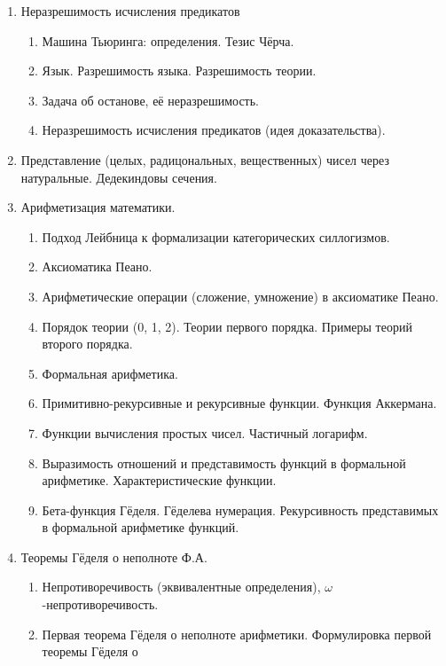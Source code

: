 \documentclass[11pt,a4paper,oneside]{scrartcl}
\begin{document}
\begin{enumerate}
\begin{enumerate}
\item Теорема Гёделя о полноте исчисления предикатов (формулировка).
\item Полнота исчисления предикатов (идея доказательства).
\item Теорема Гёделя о компактности.
\end{enumerate}
\item Неразрешимость исчисления предикатов
\begin{enumerate}
\item Машина Тьюринга: определения. Тезис Чёрча.
\item Язык. Разрешимость языка. Разрешимость теории. 
\item Задача об останове, её неразрешимость. 
\item Неразрешимость исчисления предикатов (идея доказательства).
\end{enumerate}
\item Представление (целых, радицональных, вещественных) чисел через натуральные.
Дедекиндовы сечения.
\item Арифметизация математики.
\begin{enumerate}
\item Подход Лейбница к формализации категорических силлогизмов.
\item Аксиоматика Пеано. 
\item Арифметические операции (сложение, умножение) в аксиоматике Пеано.
\item Порядок теории (0, 1, 2). Теории первого порядка. Примеры теорий второго порядка.
\item Формальная арифметика. 
\item Примитивно-рекурсивные и рекурсивные функции. Функция Аккермана. 
\item Функции вычисления простых чисел. Частичный логарифм.
\item Выразимость отношений и представимость функций в формальной арифметике. Характеристические функции.
\item Бета-функция Гёделя. 
Гёделева нумерация. Рекурсивность представимых в формальной арифметике функций.
\end{enumerate}
\item Теоремы Гёделя о неполноте Ф.А.
\begin{enumerate}
\item Непротиворечивость (эквивалентные определения), $\omega$-не\-про\-ти\-во\-ре\-чи\-вость. 
\item Первая теорема Гёделя о неполноте арифметики. Формулировка первой теоремы Гёделя о 

\end{enumerate}
\end{enumerate}
\end{document}
